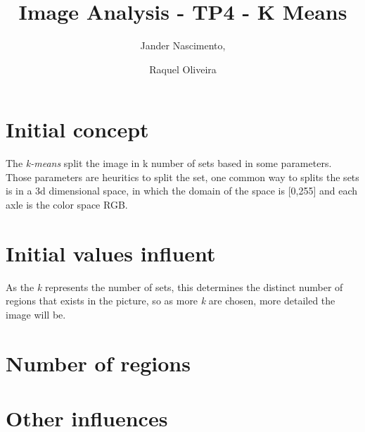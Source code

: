 \documentclass{article}
\begin{document}
\title{Image Analysis - TP4 - K Means}

\author{Jander Nascimento, 
\and Raquel Oliveira}

\maketitle

\section{Initial concept}

The \emph{k-means} split the image in k number of sets based in some parameters. Those parameters are heuritics to split the set, one common way to splits the sets is in a 3d dimensional space, in which the domain of the space is [0,255] and each axle is the color space RGB. 

\section{Initial values influent}

As the \emph{k} represents the number of sets, this determines the distinct number of regions that exists in the picture, so as more \emph{k} are chosen, more detailed the image will be.  

\section{Number of regions}
\section{Other influences}
\end{document}
